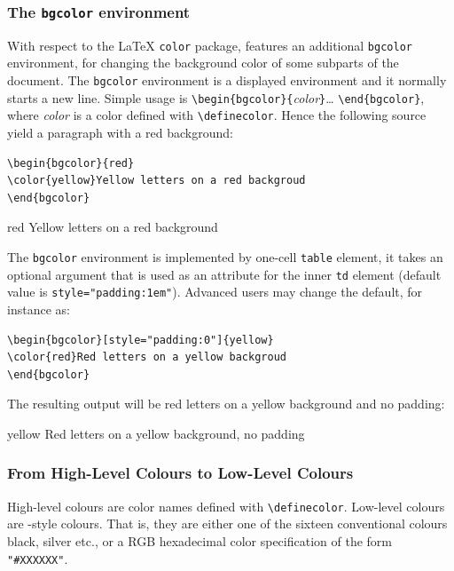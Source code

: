 \subsubsection{The \texttt{bgcolor} environment}
\label{bgcolor}
With respect to the \LaTeX{} \texttt{color} package, \hevea{} features
an additional
\texttt{bgcolor} environment, for changing the background color of some
subparts of the document.
The \texttt{bgcolor} environment is a displayed environment and it
normally starts a new line.
Simple usage is \verb+\begin{bgcolor}{+\textit{color}\verb+}+\ldots{}
\verb+\end{bgcolor}+, where
\textit{color} is a color defined with \verb+\definecolor+.
Hence the following source yield a paragraph with a red background:
\begin{verbatim}
\begin{bgcolor}{red}
\color{yellow}Yellow letters on a red backgroud
\end{bgcolor}
\end{verbatim}
\begin{htmlonly}
\begin{bgcolor}{red}
\color{yellow}Yellow letters on a red background
\end{bgcolor}
\end{htmlonly}

The \texttt{bgcolor} environment is implemented by one-cell
\verb+table+ element, it takes an
optional argument that is used as an attribute for the inner \verb+td+
element (default value is \verb+style="padding:1em"+).
Advanced users may change the default, for instance as:
\begin{verbatim}
\begin{bgcolor}[style="padding:0"]{yellow}
\color{red}Red letters on a yellow backgroud
\end{bgcolor}
\end{verbatim}
The resulting output will be red letters
on a yellow background and no padding:
\begin{htmlonly}
\begin{bgcolor}[style="padding:0"]{yellow}
\color{red}Red letters on a yellow background, no padding
\end{bgcolor}
\end{htmlonly}


\subsubsection{From High-Level Colours to Low-Level Colours}\label{getcolor}
High-level colours are color names
defined with \verb+\definecolor+.
Low-level colours are \html-style colours.
That is, they are either one of the sixteen conventional colours black,
silver etc., or a RGB hexadecimal color specification of the form
\verb+"#XXXXXX"+.


